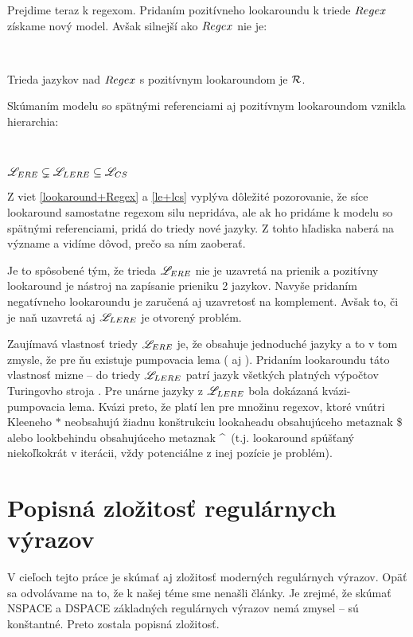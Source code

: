 Prejdime teraz k regexom. Pridaním pozitívneho lookaroundu k triede $Regex$ získame nový model. Avšak silnejší ako $Regex$ nie je:
\begin{veta} \textbf{\emph{\cite[Veta 2.2.10.]{mojaBak}}}\label{lookaround+Regex} \ \par
Trieda jazykov nad $Regex$ s pozitívnym lookaroundom je ${\cal R}$.
\end{veta}

Skúmaním modelu so spätnými referenciami aj pozitívnym lookaroundom vznikla hierarchia:
\begin{veta}\textbf{\emph{\cite[Vety 2.2.13 a 2.2.14.]{mojaBak}}}\label{le+lcs} \ \par
$ \mathscr{L}_{ERE} \subsetneq \mathscr{L}_{LERE} \subseteq \mathscr{L}_{CS} $
\end{veta}

Z viet \ref{lookaround+Regex} a \ref{le+lcs} vyplýva dôležité pozorovanie, že síce lookaround samostatne regexom silu nepridáva, ale ak ho pridáme k modelu so spätnými referenciami, pridá do triedy nové jazyky. Z tohto hľadiska naberá na význame a vidíme dôvod, prečo sa ním zaoberať.

Je to spôsobené tým, že trieda $\mathscr{L}_{ERE}$ nie je uzavretá na prienik \cite{ExtendedRegexIntersec} a pozitívny lookaround je nástroj na zapísanie prieniku 2 jazykov. Navyše pridaním negatívneho lookaroundu je zaručená aj uzavretosť na komplement. Avšak to, či je naň uzavretá aj $\mathscr{L}_{LERE}$ je otvorený problém.

Zaujímavá vlastnosť triedy $\mathscr{L}_{ERE}$ je, že obsahuje jednoduché jazyky a to v tom zmysle, že pre ňu existuje pumpovacia lema (\cite{ExtendedRegexPower} aj \cite{ExtendedRegexIntersec}). Pridaním look\-aroundu táto vlastnosť mizne -- do triedy $\mathscr{L}_{LERE}$ patrí jazyk všetkých platných výpočtov Turingovho stroja \cite[Veta 2.2.16.]{mojaBak}. Pre unárne jazyky z $\mathscr{L}_{LERE}$ bola dokázaná kvázi-pumpovacia lema. Kvázi preto, že platí len pre množinu regexov, ktoré vnútri Kleeneho $*$ neobsahujú žiadnu konštrukciu lookaheadu obsahujúceho metaznak \$ alebo lookbehindu obsahujúceho metaznak \textasciicircum ~(t.j. lookaround spúšťaný niekoľkokrát v iterácii, vždy potenciálne z inej pozície je problém).


\section[Popisná zložitosť]{Popisná zložitosť regulárnych výrazov}
\label{uzlozitost}

V cieľoch tejto práce je skúmať aj zložitosť moderných regulárnych výrazov. Opäť sa odvolávame na to, že k našej téme sme nenašli články. Je zrejmé, že skúmať NSPACE a DSPACE základných regulárnych výrazov nemá zmysel -- sú konštantné. Preto zostala popisná zložitosť.

